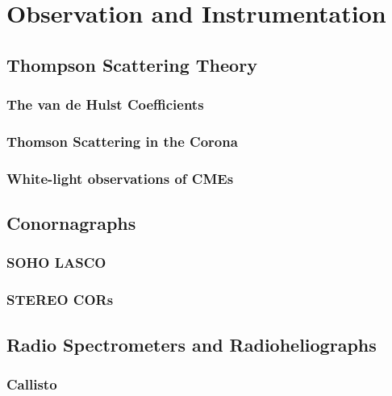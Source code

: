 

\chapter{Observation and Instrumentation} 
\label{chap:2}

\section{Thompson Scattering Theory}\label{sec:3}

\subsection{The van de Hulst Coefficients}\label{sec:30}

\subsection{Thomson Scattering in the Corona}\label{sec:31}

\subsection{White-light observations of CMEs}


\section{Conornagraphs}\label{sec:1}

\subsection{SOHO LASCO}\label{sec:10}

\subsection{STEREO CORs}\label{sec:11}



\section{Radio Spectrometers and Radioheliographs}\label{sec:2}

\subsection{Callisto}\label{sec:20}

